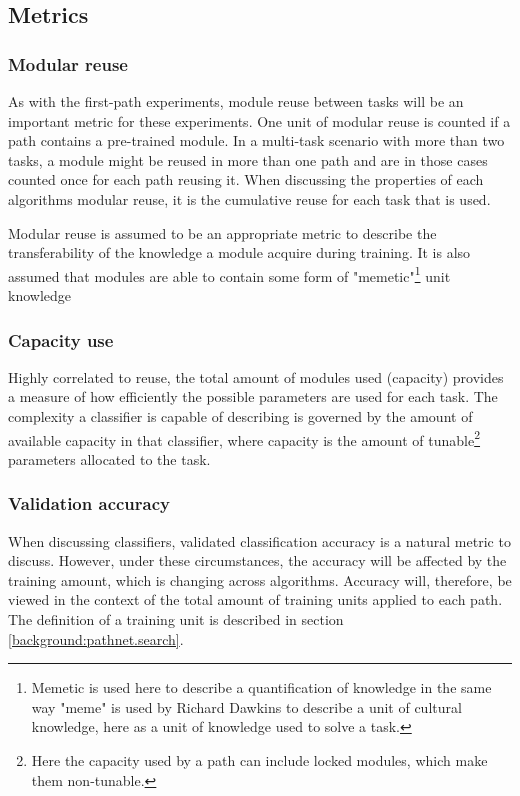 \subsection{Metrics}
\label{exp2:metrics}

\subsubsection{Modular reuse}
As with the first-path experiments, module reuse between tasks will be an important metric for these experiments. One unit of modular reuse is counted if a path contains a pre-trained module. In a multi-task scenario with more than two tasks, a module might be reused in more than one path and are in those cases counted once for each path reusing it. When discussing the properties of each algorithms modular reuse, it is the cumulative reuse for each task that is used.

Modular reuse is assumed to be an appropriate metric to describe the transferability of the knowledge a module acquire during training. It is also assumed that modules are able to contain some form of "memetic"\footnote{Memetic is used here to describe a quantification of knowledge in the same way "meme" is used by Richard Dawkins\cite{selfishGene} to describe a unit of cultural knowledge, here as a unit of knowledge used to solve a task.} unit knowledge

\subsubsection{Capacity use}
Highly correlated to reuse, the total amount of modules used (capacity) provides a measure of how efficiently the possible parameters are used for each task. The complexity a classifier is capable of describing is governed by the amount of available capacity in that classifier, where capacity is the amount of tunable\footnote{Here the capacity used by a path can include locked modules, which make them non-tunable.} parameters allocated to the task.

\subsubsection{Validation accuracy}
When discussing classifiers, validated classification accuracy is a natural metric to discuss. However, under these circumstances, the accuracy will be affected by the training amount, which is changing across algorithms. Accuracy will, therefore, be viewed in the context of the total amount of training units applied to each path. The definition of a training unit is described in section \ref{background:pathnet.search}.

